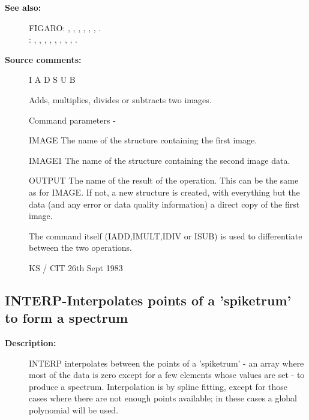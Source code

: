\begin{description}
\begin{description}
\item [\textbf{See also:}]
FIGARO: , , , , , , .\\
: , , , , , , , , .\\

\item [\textbf{Source comments:}]
\begin{terminalv}
 I A D S U B

 Adds, multiplies, divides or subtracts two images.

 Command parameters -

 IMAGE  The name of the structure containing the first image.

 IMAGE1 The name of the structure containing the second
        image data.

 OUTPUT The name of the result of the operation.  This can
        be the same as for IMAGE.  If not, a new structure
        is created, with everything but the data (and any error
        or data quality information) a direct copy of the first
        image.

 The command itself (IADD,IMULT,IDIV or ISUB) is used to
 differentiate between the two operations.

                                  KS / CIT 26th Sept 1983
\end{terminalv}
\end{description}
\subsection{INTERP-\label{INTERP}Interpolates points of a 'spiketrum' to form a spectrum}
\begin{description}

\item [\textbf{Description:}]
 INTERP interpolates between the points of a 'spiketrum' - an
 array where most of the data is zero except for a few elements
 whose values are set - to produce a spectrum.  Interpolation is
 by spline fitting, except for those cases where there are not
 enough points available; in these cases a global polynomial will
 be used.


\end{description}
\end{description}
